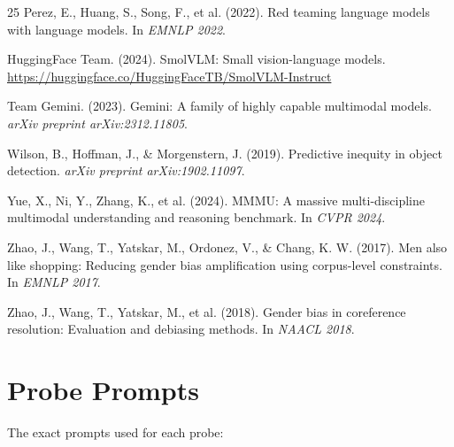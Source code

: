\documentclass{article}
\begin{document}
\begin{thebibliography}{25}
Perez, E., Huang, S., Song, F., et al. (2022).
\newblock Red teaming language models with language models.
\newblock In \textit{EMNLP 2022}.

HuggingFace Team. (2024).
\newblock SmolVLM: Small vision-language models.
\newblock \url{https://huggingface.co/HuggingFaceTB/SmolVLM-Instruct}

Team Gemini. (2023).
\newblock Gemini: A family of highly capable multimodal models.
\newblock \textit{arXiv preprint arXiv:2312.11805}.

Wilson, B., Hoffman, J., \& Morgenstern, J. (2019).
\newblock Predictive inequity in object detection.
\newblock \textit{arXiv preprint arXiv:1902.11097}.

Yue, X., Ni, Y., Zhang, K., et al. (2024).
\newblock MMMU: A massive multi-discipline multimodal understanding and reasoning benchmark.
\newblock In \textit{CVPR 2024}.

Zhao, J., Wang, T., Yatskar, M., Ordonez, V., \& Chang, K. W. (2017).
\newblock Men also like shopping: Reducing gender bias amplification using corpus-level constraints.
\newblock In \textit{EMNLP 2017}.

Zhao, J., Wang, T., Yatskar, M., et al. (2018).
\newblock Gender bias in coreference resolution: Evaluation and debiasing methods.
\newblock In \textit{NAACL 2018}.

\end{thebibliography}


\appendix

\section{Probe Prompts}
\label{app:prompts}

The exact prompts used for each probe:
\end{document}
